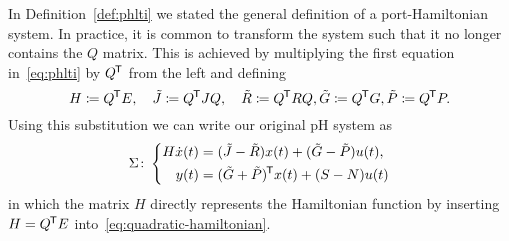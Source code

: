 \begin{remark}
    In Definition~\ref{def:phlti} we stated the general definition of a port-Hamiltonian system.
    In practice, it is common to transform the system such that it no longer contains the $Q$ matrix.
    This is achieved by multiplying the first equation in~\eqref{eq:phlti} by $Q^{\mkern-1.5mu \mathsf{T}}$ from the left and defining
    \begin{equation*}
        H \coloneqq Q^{\mkern-1.5mu \mathsf{T}} E,\quad \tilde{J} \coloneqq Q^{\mkern-1.5mu \mathsf{T}} J Q,\quad \tilde{R} \coloneqq Q^{\mkern-1.5mu \mathsf{T}} R Q, \tilde{G} \coloneqq Q^{\mkern-1.5mu \mathsf{T}} G, \tilde{P} \coloneqq Q^{\mkern-1.5mu \mathsf{T}} P.
    \end{equation*}
    Using this substitution we can write our original pH system as
    \begin{equation*}
        \Sigma \colon \left\lbrace
        \begin{aligned}
            H \dot{x}(t) &= (\tilde{J} - \tilde{R}) x(t) + (\tilde{G} - \tilde{P}) u(t), \\
            y(t) &= (\tilde{G} + \tilde{P})^{\mkern-1.5mu \mathsf{T}} x(t) + (S - N) u(t)
        \end{aligned}
        \right.
    \end{equation*}
    in which the matrix $H$ directly represents the Hamiltonian function by inserting $H = Q^{\mkern-1.5mu \mathsf{T}} E$ into~\eqref{eq:quadratic-hamiltonian}.
\end{remark}

